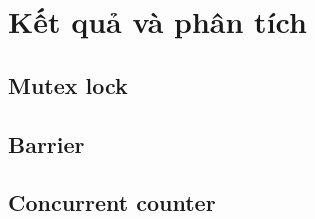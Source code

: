 \documentclass[a4paper]{article}
\begin{document}
\section{Kết quả và phân tích}

\subsection{Mutex lock}

\subsection{Barrier}

\subsection{Concurrent counter}

\end{document}

